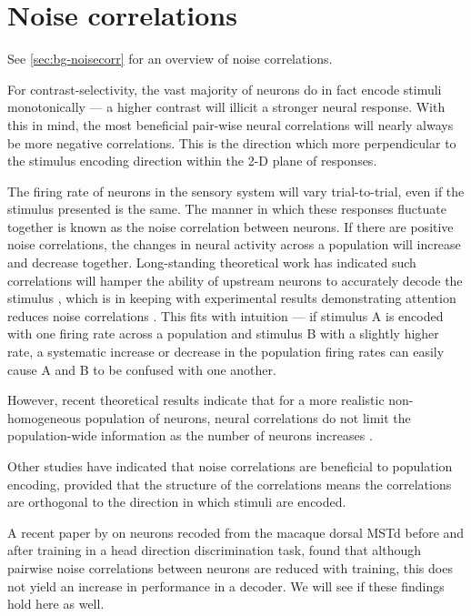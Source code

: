 \FloatBarrier
\section{Noise correlations}

See \autoref{sec:bg-noisecorr} for an overview of noise correlations.

For contrast-selectivity, the vast majority of neurons do in fact encode stimuli monotonically --- a higher contrast will illicit a stronger neural response. With this in mind, the most beneficial pair-wise neural correlations will nearly always be more negative correlations. This is the direction which more perpendicular to the stimulus encoding direction within the 2-D plane of responses.



The firing rate of neurons in the sensory system will vary trial-to-trial, even if the stimulus presented is the same.
The manner in which these responses fluctuate together is known as the noise correlation between neurons.
If there are positive noise correlations, the changes in neural activity across a population will increase and decrease together.
Long-standing theoretical work has indicated such correlations will hamper the ability of upstream neurons to accurately decode the stimulus%
, which is in keeping with experimental results demonstrating attention reduces noise correlations \citep{Cohen2009}.
This fits with intuition --- if stimulus A is encoded with one firing rate across a population and stimulus B with a slightly higher rate, a systematic increase or decrease in the population firing rates can easily cause A and B to be confused with one another.

However, recent theoretical results indicate that for a more realistic non-homogeneous population of neurons, neural correlations do not limit the population-wide information as the number of neurons increases \citep{Oram1998,Averbeck2006,Ecker2011}.

Other studies have indicated that noise correlations are beneficial to population encoding, provided that the structure of the correlations means the correlations are orthogonal to the direction in which stimuli are encoded.

A recent paper by \citet{Gu2011} on neurons recoded from the macaque dorsal \ac{MSTd} before and after training in a head direction discrimination task, found that although pairwise noise correlations between neurons are reduced with training, this does not yield an increase in performance in a decoder.
We will see if these findings hold here as well.


